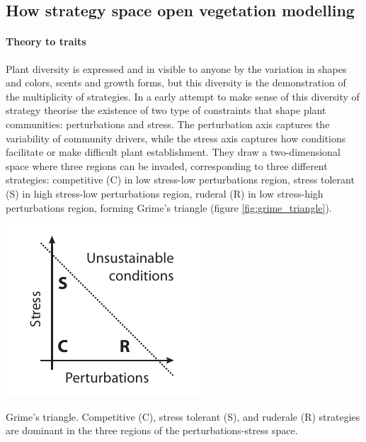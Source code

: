 \subsection{How strategy space open vegetation modelling}


\paragraph{Theory to traits}

Plant diversity is expressed and in visible to anyone by the variation in shapes and colors, scents and growth forms, but this diversity is the demonstration of the multiplicity of strategies. In a early attempt to make sense of this diversity of strategy \cite{grime_evidence_1977} theorise the existence of two type of constraints that shape plant communities: perturbations and stress. The perturbation axis captures the variability of community drivers, while the stress axis captures how conditions facilitate or make difficult plant establishment. They draw a two-dimensional space where three regions can be invaded, corresponding to three different strategies: competitive (C) in low stress-low perturbations region, stress tolerant (S) in high stress-low perturbations region, ruderal (R) in low stress-high perturbations region, forming Grime's triangle (\see figure \ref{fig:grime_triangle}).

\begin{marginfigure}
    \includegraphics{./Figures/Grime_triangle.pdf}
  \caption[Diversity insurance effect]{Grime's triangle. Competitive (C), stress tolerant (S), and ruderale (R) strategies are dominant in the three regions of the perturbations-stress space.}
  \label{fig:grime_triangle}
\end{marginfigure}

